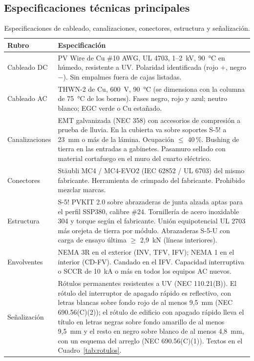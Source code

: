 \documentclass[12pt]{article}
\begin{document}
\subsection{Especificaciones técnicas principales}
\begin{table}[H]
\centering\small
\caption{Especificaciones de cableado, canalizaciones, conectores, estructura y señalización.}\label{tab:especificaciones}
\begin{tabularx}{\textwidth}{L{2.6cm}Y}
\toprule
\textbf{Rubro} & \textbf{Especificación}\\
\midrule
Cableado DC & PV Wire de Cu \#10 AWG, UL 4703, 1--2~kV, 90~°C en húmedo, resistente a UV. Polaridad identificada (rojo +, negro $-$). Sin empalmes fuera de cajas listadas.\\
Cableado AC & THWN-2 de Cu, 600~V, 90~°C (se dimensiona con la columna de 75~°C de los bornes). Fases negro, rojo y azul; neutro blanco; EGC verde o Cu estañado.\\
Canalizaciones & EMT galvanizada (NEC 358) con accesorios de compresión a prueba de lluvia. En la cubierta va sobre soportes S-5! a 23~mm o más de la lámina. Ocupación $\leq$ 40\,\%. Bushing de tierra en las entradas a gabinetes. Pasamuro sellado con material cortafuego en el muro del cuarto eléctrico.\\
Conectores & Stäubli MC4 / MC4-EVO2 (IEC 62852 / UL 6703) del mismo fabricante. Herramienta de crimpado del fabricante. Prohibido mezclar marcas.\\
Estructura & S-5! PVKIT 2.0 sobre abrazaderas de junta alzada aptas para el perfil SSP380, calibre \#24. Tornillería de acero inoxidable 304 y torque según el fabricante. Unión equipotencial UL 2703 más orejeta de tierra por módulo. Abrazaderas S-5-U con carga de ensayo última $\geq$ 2,9~kN (líneas interiores).\\
Envolventes & NEMA 3R en el exterior (INV, TFV, IFV); NEMA 1 en el interior (CD-FV). Candado en el IFV. Capacidad interruptiva o SCCR de 10~kA o más en todos los equipos AC nuevos.\\
Señalización & Rótulos permanentes resistentes a UV (NEC 110.21(B)). El rótulo del interruptor de apagado rápido es reflectivo, con letras blancas sobre fondo rojo de al menos 9,5~mm (NEC 690.56(C)(2)); el rótulo de edificio con apagado rápido lleva el título en letras negras sobre fondo amarillo de al menos 9,5~mm y el resto en negro sobre blanco de al menos 4,8~mm, con un esquema del arreglo (NEC 690.56(C)(1)). Textos en el Cuadro~\ref{tab:rotulos}.\\
\bottomrule
\end{tabularx}
\end{table}
\end{document}
